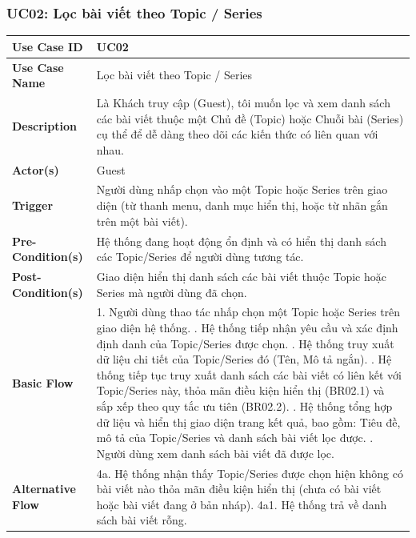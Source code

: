 \documentclass[a4paper,12pt]{article}
\begin{document}
\subsubsection{UC02: Lọc bài viết theo Topic / Series}
\begin{longtable}{|p{4cm}|p{11.5cm}|}
\hline
\textbf{Use Case ID} & UC02 \\ \hline
\textbf{Use Case Name} & Lọc bài viết theo Topic / Series \\ \hline
\textbf{Description} & Là Khách truy cập (Guest), tôi muốn lọc và xem danh sách các bài viết thuộc một Chủ đề (Topic) hoặc Chuỗi bài (Series) cụ thể để dễ dàng theo dõi các kiến thức có liên quan với nhau. \\ \hline
\textbf{Actor(s)} & Guest \\ \hline
\textbf{Trigger} & Người dùng nhấp chọn vào một Topic hoặc Series trên giao diện (từ thanh menu, danh mục hiển thị, hoặc từ nhãn gắn trên một bài viết). \\ \hline
\textbf{Pre-Condition(s)} & Hệ thống đang hoạt động ổn định và có hiển thị danh sách các Topic/Series để người dùng tương tác. \\ \hline
\textbf{Post-Condition(s)} & Giao diện hiển thị danh sách các bài viết thuộc Topic hoặc Series mà người dùng đã chọn. \\ \hline
\textbf{Basic Flow} & 
1. Người dùng thao tác nhấp chọn một Topic hoặc Series trên giao diện hệ thống. \newline
2. Hệ thống tiếp nhận yêu cầu và xác định định danh của Topic/Series được chọn. \newline
3. Hệ thống truy xuất dữ liệu chi tiết của Topic/Series đó (Tên, Mô tả ngắn). \newline
4. Hệ thống tiếp tục truy xuất danh sách các bài viết có liên kết với Topic/Series này, thỏa mãn điều kiện hiển thị (BR02.1) và sắp xếp theo quy tắc ưu tiên (BR02.2). \newline
5. Hệ thống tổng hợp dữ liệu và hiển thị giao diện trang kết quả, bao gồm: Tiêu đề, mô tả của Topic/Series và danh sách bài viết lọc được. \newline
6. Người dùng xem danh sách bài viết đã được lọc. \\ \hline
\textbf{Alternative Flow} & 
4a. Hệ thống nhận thấy Topic/Series được chọn hiện không có bài viết nào thỏa mãn điều kiện hiển thị (chưa có bài viết hoặc bài viết đang ở bản nháp). \newline
4a1. Hệ thống trả về danh sách bài viết rỗng. \newline

\end{longtable}
\end{document}

